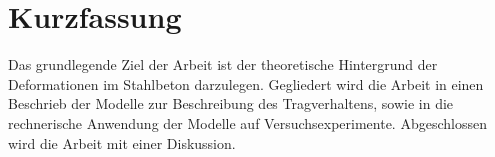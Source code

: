 \chapter*{Kurzfassung}

Das grundlegende Ziel der Arbeit ist der theoretische Hintergrund der Deformationen im Stahlbeton darzulegen. Gegliedert wird die Arbeit in einen Beschrieb der Modelle zur Beschreibung des Tragverhaltens, sowie in die rechnerische Anwendung der Modelle auf Versuchsexperimente. Abgeschlossen wird die Arbeit mit einer Diskussion.